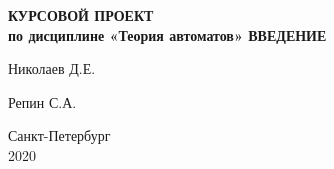 \begin{titlepage}
\begin{center}
    \vfill

    \uppercase{\textbf{\large{
        Курсовой проект
    }}}
    \\
    \textbf{\large{
      по дисциплине «Теория автоматов»
    }}
    \vfill
    \uppercase{\textbf{\Large{
        Введение
    }}}
  \bigskip
\end{center}

\vfill

\begin{flushright}
    Николаев Д.Е.
\end{flushright}

\begin{flushright}
    Репин С.А.
\end{flushright}

\hfill
\hfill

\begin{center}
  Санкт-Петербург\\2020
\end{center}

\end{titlepage}


